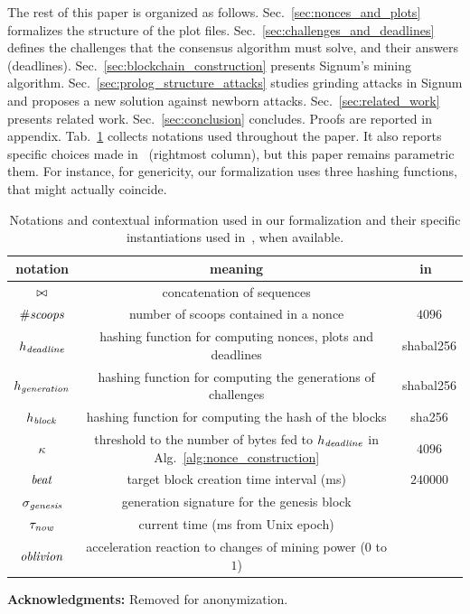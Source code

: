 The rest of this paper is organized as follows.
Sec.~\ref{sec:nonces_and_plots} formalizes the structure of the plot files.
Sec.~\ref{sec:challenges_and_deadlines} defines the challenges that the consensus
algorithm must solve, and their answers (deadlines).
Sec.~\ref{sec:blockchain_construction} presents Signum's mining algorithm.
Sec.~\ref{sec:prolog_structure_attacks} studies grinding attacks
in Signum and proposes a new solution against newborn attacks.
Sec.~\ref{sec:related_work} presents related work.
Sec.~\ref{sec:conclusion} concludes. Proofs are reported in appendix.
Tab.~\ref{tab:notations} collects notations used throughout the paper.
It also reports specific choices
made in~\cite{SignumPlotting} (rightmost column), but this paper remains parametric \wrt them.
For instance, for genericity,
our formalization uses three hashing functions, that might actually coincide.

\begin{table}[t]
\begin{center}
\begin{tabular}{|c|c|c|}
  \hline
  \textbf{notation} & \textbf{meaning} & \textbf{in~\cite{SignumPlotting}}\\\hline\hline

  $\operatorname*{\bowtie}$ & concatenation of sequences & \\\hline
  ${\#\mathit{scoops}}$ & number of scoops contained in a nonce & $4096$\\\hline

  $h_{\mathit{deadline}}$ & hashing function for computing nonces, plots and deadlines & shabal256\\\hline

  $h_{\mathit{generation}}$ & hashing function for computing the generations of challenges & shabal256\\\hline

  $h_{\mathit{block}}$ & hashing function for computing the hash of the blocks & sha256 \\\hline

  $\kappa$ & threshold to the number of bytes fed to $h_{\mathit{deadline}}$ in Alg.~\ref{alg:nonce_construction} & $4096$\\\hline

  ${\mathit{beat}}$ & target block creation time interval (ms) & $240000$ \\\hline

  $\sigma_{\mathit{genesis}}$ & generation signature for the genesis block & \\\hline

  $\tau_{\mathit{now}}$ & current time (ms from Unix epoch) & \\\hline

  ${\mathit{oblivion}}$ & acceleration reaction to changes of mining power ($0$ to $1$) & \\\hline
\end{tabular}
\end{center}
\caption{Notations and contextual information used in our formalization and their specific instantiations
  used in~\cite{SignumPlotting}, when available.}
\label{tab:notations}
\end{table}

\vspace*{1ex}
\textbf{Acknowledgments:}
Removed for anonymization. %
